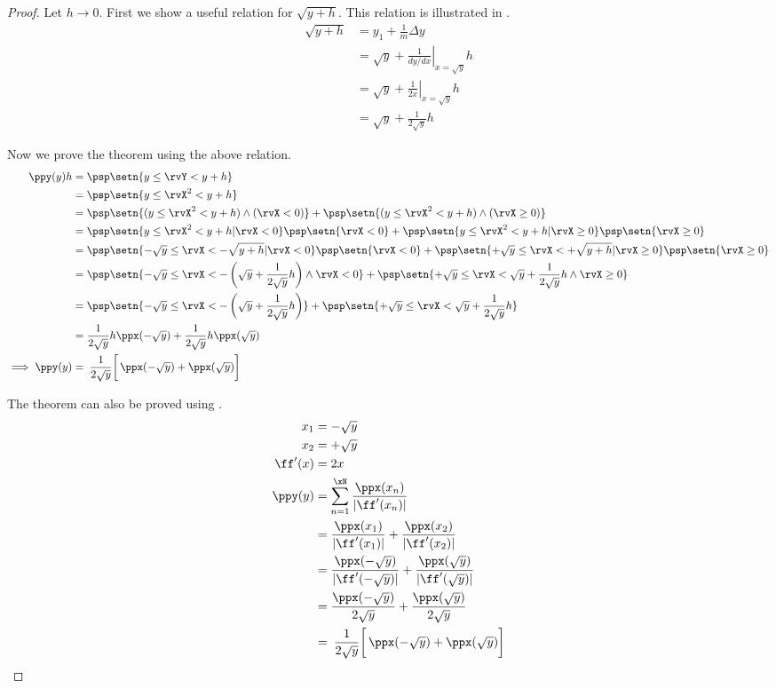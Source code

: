 \begin{proof}
Let $h\to0$.
First we show a useful relation for $\sqrt{y+h}$.
This relation is illustrated in .
\begin{align*}
  \sqrt{y+h}
    &=    y_1 + \frac{1}{m} \Delta y
  \\&=    \sqrt{y} + \left.\frac{1}{dy/dx}\right|_{x=\sqrt{y}} h
  \\&=    \sqrt{y} + \left.\frac{1}{2x}\right|_{x=\sqrt{y}} h
  \\&=    \sqrt{y} + \frac{1}{2\sqrt{y}} h
\end{align*}

Now we prove the theorem using the above relation.
\begin{align*}
  \ppy(y)h
    &= \psp\setn{y\le\rvY < y+h}
  \\&= \psp\setn{y\le\rvX^2 < y+h}
  \\&= \psp\setn{(y\le\rvX^2 < y+h) \land (\rvX<0)}+ \psp\setn{(y\le\rvX^2 < y+h) \land (\rvX\ge0)}
  \\&= \psp\setn{y\le\rvX^2 < y+h |\rvX<0}\psp\setn{\rvX<0} + \psp\setn{y\le\rvX^2 < y+h |\rvX\ge0}\psp\setn{\rvX\ge0}
  \\&= \psp\setn{-\sqrt{y}\le\rvX < -\sqrt{y+h} |\rvX<0  } \psp\setn{\rvX<0} +
       \psp\setn{+\sqrt{y}\le\rvX < +\sqrt{y+h} |\rvX\ge0} \psp\setn{\rvX\ge0}
  \\&= \psp\setn{-\sqrt{y}\le\rvX < -\left(\sqrt{y}+\frac{1}{2\sqrt{y}}h\right) \land\rvX<0   } +
       \psp\setn{+\sqrt{y}\le\rvX <        \sqrt{y}+\frac{1}{2\sqrt{y}}h        \land\rvX\ge0 }
  \\&= \psp\setn{-\sqrt{y}\le\rvX < -\left(\sqrt{y}+\frac{1}{2\sqrt{y}}h\right)  } +
       \psp\setn{+\sqrt{y}\le\rvX <        \sqrt{y}+\frac{1}{2\sqrt{y}}h         }
  \\&= \frac{1}{2\sqrt{y}}h\ppx(-\sqrt{y})  +
       \frac{1}{2\sqrt{y}}h\ppx( \sqrt{y})
\\\implies
  \ppy(y)
    &=  \left.\left.\frac{1}{2\sqrt{y}}\right[
        \ppx(-\sqrt{y}) + \ppx( \sqrt{y}) \right]
\end{align*}

The theorem can also be proved using .
\begin{align*}
  x_1 &= -\sqrt{y} \\
  x_2 &= +\sqrt{y} \\
  \ff'(x) &= 2x    \\
  \ppy(y)
    &= \sum_{n=1}^{\xN} \frac{\ppx(x_n)}{|\ff'(x_n)|}
  \\&= \frac{\ppx(x_1)}{|\ff'(x_1)|} + \frac{\ppx(x_2)}{|\ff'(x_2)|}
  \\&= \frac{\ppx(-\sqrt{y})}{|\ff'(-\sqrt{y})|} + \frac{\ppx(\sqrt{y})}{|\ff'(\sqrt{y})|}
  \\&= \frac{\ppx(-\sqrt{y})}{2\sqrt{y}} + \frac{\ppx(\sqrt{y})}{2\sqrt{y}}
  \\&=    \left.\left.\frac{1}{2\sqrt{y}}\right[
          \ppx(-\sqrt{y}) + \ppx( \sqrt{y}) \right]
\end{align*}
\end{proof}




